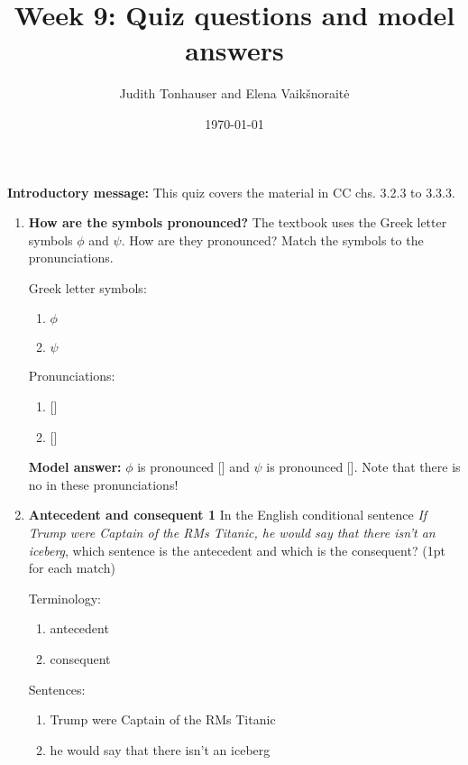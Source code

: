\documentclass[a4,11pt]{article}
\title{Week 9: Quiz questions and model answers}
\author{Judith Tonhauser and Elena Vaik\v snorait\.{e} }
\date{\today}
\newcommand{\6}{\mbox{$[\hspace*{-.6mm}[$}}
\newcommand{\9}{\mbox{$]\hspace*{-.6mm}]$}}
\begin{document}
\maketitle

{\bf Introductory message:} This quiz covers the material in CC chs. 3.2.3 to 3.3.3.

\begin{enumerate}[leftmargin = 12pt]

\item {\bf How are the symbols pronounced?} The textbook uses the Greek letter symbols $\phi$ and $\psi$. How are they pronounced? Match the symbols to the pronunciations.

Greek letter symbols:

\begin{enumerate}
\item $\phi$
\item $\psi$
\end{enumerate}

Pronunciations:

\begin{enumerate}
\item {} []
\item {} []
\end{enumerate}

{\bf Model answer:} $\phi$ is pronounced [] and $\psi$ is pronounced []. Note that there is no  in these pronunciations!

\item {\bf  Antecedent and consequent 1} In the English conditional sentence {\em If Trump were Captain of the RMs Titanic, he would say that there isn't an iceberg}, which sentence is the antecedent and which is the consequent? (1pt for each match)

Terminology:

\begin{enumerate}
\item antecedent
\item consequent
\end{enumerate}

Sentences:

\begin{enumerate}
\item Trump were Captain of the RMs Titanic
\item he would say that there isn't an iceberg
\end{enumerate}


\end{enumerate}
\end{document}

